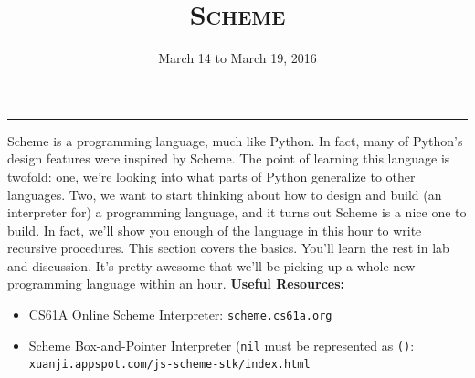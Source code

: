 \documentclass{exam}
\title{\textsc{Scheme}}
\date{March 14 to March 19, 2016}
\begin{document}
\maketitle
\rule{\textwidth}{0.15em}
\fontsize{12}{15}\selectfont




\begin{blocksection}
Scheme is a programming language, much like Python. In fact, many of Python's design features were inspired by Scheme. The point of learning this language is twofold: one, we're looking into what parts of Python generalize to other languages. Two, we want to start thinking about how to design and build (an interpreter  for) a programming language, and it turns out Scheme is a nice one to build. In fact, we'll show you enough of the language in this hour to write recursive procedures. This section covers the basics. You'll learn the rest in lab and discussion. It's pretty awesome that we'll be picking up a whole new programming language within an hour.
\newline
\newline
\textbf{Useful Resources:}
\begin{itemize}
    \item CS61A Online Scheme Interpreter: \texttt{scheme.cs61a.org}
    \item Scheme Box-and-Pointer Interpreter (\texttt{nil} must be represented
        as \texttt{()}: \texttt{xuanji.appspot.com/js-scheme-stk/index.html}
\end{itemize}
\end{blocksection}
\end{document}
